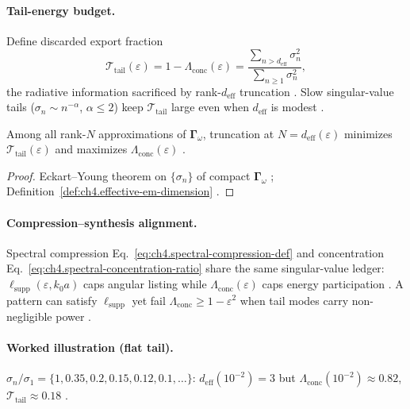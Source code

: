 
\paragraph{Tail-energy budget.}
Define discarded export fraction
\begin{equation}
\label{eq:ch4.tail-discard}
\mathcal{T}_{\mathrm{tail}}(\varepsilon)=1-\Lambda_{\mathrm{conc}}(\varepsilon)=\frac{\sum_{n>d_{\mathrm{eff}}}\sigma_{n}^{2}}{\sum_{n\ge1}\sigma_{n}^{2}},
\end{equation}
the radiative information sacrificed by rank-\(d_{\mathrm{eff}}\) truncation \cite{harrington2001,hansen1988,stratton1941}. Slow singular-value
tails (\(\sigma_{n}\sim n^{-\alpha}\), \(\alpha\le2\)) keep \(\mathcal{T}_{\mathrm{tail}}\) large even when \(d_{\mathrm{eff}}\) is modest
\cite{devaney2004}.

\begin{theorem}
\label{thm:ch4.eckart-young-conc}
Among all rank-\(N\) approximations of \(\boldsymbol{\Gamma}_\omega\), truncation at \(N=d_{\mathrm{eff}}(\varepsilon)\) minimizes
\(\mathcal{T}_{\mathrm{tail}}(\varepsilon)\) and maximizes \(\Lambda_{\mathrm{conc}}(\varepsilon)\) \cite{harrington2001,devaney2004,stratton1941,hansen1988}.
\end{theorem}
\begin{proof}
Eckart--Young theorem on \(\{\sigma_{n}\}\) of compact \(\boldsymbol{\Gamma}_\omega\) \cite{harrington2001}; Definition~\ref{def:ch4.effective-em-dimension}
\cite{stratton1941}.
\end{proof}

\paragraph{Compression--synthesis alignment.}
Spectral compression Eq.~\eqref{eq:ch4.spectral-compression-def} and concentration Eq.~\eqref{eq:ch4.spectral-concentration-ratio} share the
same singular-value ledger: \(\ell_{\mathrm{supp}}(\varepsilon,k_{0}a)\) caps angular listing while \(\Lambda_{\mathrm{conc}}(\varepsilon)\) caps
energy participation \cite{hansen1988,stratton1941,harrington2001}. A pattern can satisfy \(\ell_{\mathrm{supp}}\) yet fail
\(\Lambda_{\mathrm{conc}}\ge1-\varepsilon^{2}\) when tail modes carry non-negligible power \cite{devaney2004}.

\paragraph{Worked illustration (flat tail).}
\(\sigma_{n}/\sigma_{1}=\{1,0.35,0.2,0.15,0.12,0.1,\ldots\}\): \(d_{\mathrm{eff}}(10^{-2})=3\) but \(\Lambda_{\mathrm{conc}}(10^{-2})\approx0.82\),
\(\mathcal{T}_{\mathrm{tail}}\approx0.18\) \cite{hansen1988,harrington2001}.

